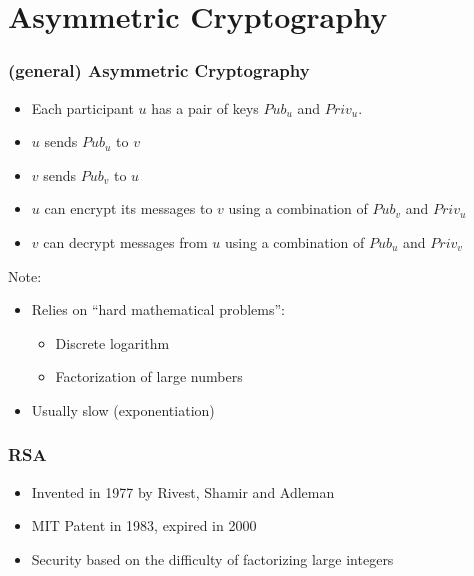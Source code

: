 \documentclass[
hyperref={pdfpagelabels=false}
,xcolor=table
]
{beamer}
\begin{document}
\section{Asymmetric Cryptography}



\begin{frame}
  \frametitle{(general) Asymmetric Cryptography}

  \begin{itemize}
  \item Each participant $u$ has a pair of keys $Pub_u$ and $Priv_u$. 
  \item $u$ sends $Pub_u$ to $v$
  \item $v$ sends $Pub_v$ to $u$
  \item $u$ can encrypt its messages to $v$ using a combination of $Pub_v$ and $Priv_u$
  \item $v$ can decrypt messages from $u$ using a combination  of $Pub_u$ and $Priv_v$
  \end{itemize}

  Note:
  \begin{itemize}
  \item Relies on ``hard mathematical problems'':
    \begin{itemize}
    \item Discrete logarithm
    \item Factorization of large numbers
    \end{itemize}
  \item Usually slow (exponentiation)
  \end{itemize}
\end{frame}

\begin{frame}
  \frametitle{RSA}
  \begin{itemize}
  \item Invented in 1977 by Rivest, Shamir and Adleman
  \item MIT Patent in 1983, expired in 2000
  \item Security based on the difficulty of factorizing large integers
  \end{itemize}
\end{frame}
\end{document}

